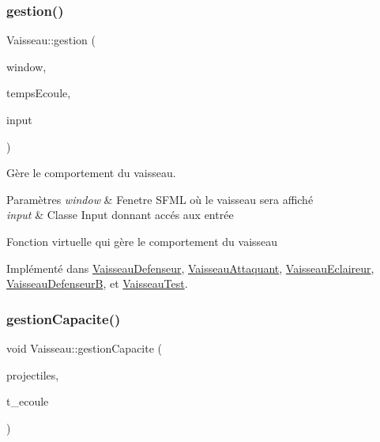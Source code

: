 \mbox{\label{class_vaisseau_afaa179c1f03255d7869b8e2296ed8307}} 
\subsubsection{\texorpdfstring{gestion()}{gestion()}}
{\footnotesize\ttfamily Vaisseau\+::gestion (\begin{DoxyParamCaption}\item[{sf\+::\+Render\+Window \&}]{window,  }\item[{sf\+::\+Time}]{temps\+Ecoule,  }\item[{\hyperlink{_input_8h_a5588d60d674991c719a8df848313e966}{Input} \&}]{input }\end{DoxyParamCaption})\hspace{0.3cm}{\ttfamily [pure virtual]}}



Gère le comportement du vaisseau. 


\begin{DoxyParams}{Paramètres}
{\em window} & Fenetre S\+F\+ML où le vaisseau sera affiché \\
\hline
{\em input} & Classe Input donnant accés aux entrée\\
\hline
\end{DoxyParams}
Fonction virtuelle qui gère le comportement du vaisseau 

Implémenté dans \hyperlink{class_vaisseau_defenseur_adb26b3df0bb5888548ff897f23e2ec82}{Vaisseau\+Defenseur}, \hyperlink{class_vaisseau_attaquant_ad95d76e5973affa6ef287edd7ad5310e}{Vaisseau\+Attaquant}, \hyperlink{class_vaisseau_eclaireur_aac6158ee2ff8454a93515546cb1be1de}{Vaisseau\+Eclaireur}, \hyperlink{class_vaisseau_defenseur_b_aae8e2488b91dbd1ceef8969debbc234f}{Vaisseau\+DefenseurB}, et \hyperlink{class_vaisseau_test_a83da402707d73465178b4e654d2e054a}{Vaisseau\+Test}.

\mbox{\label{class_vaisseau_a21fbd13a4fad50af3ae34a36dbcb6820}} 
\subsubsection{\texorpdfstring{gestion\+Capacite()}{gestionCapacite()}}
{\footnotesize\ttfamily void Vaisseau\+::gestion\+Capacite (\begin{DoxyParamCaption}\item[{std\+::vector$<$ \hyperlink{class_projectile}{Projectile} $\ast$$>$ \&}]{projectiles,  }\item[{sf\+::\+Time}]{t\+\_\+ecoule }\end{DoxyParamCaption})}

